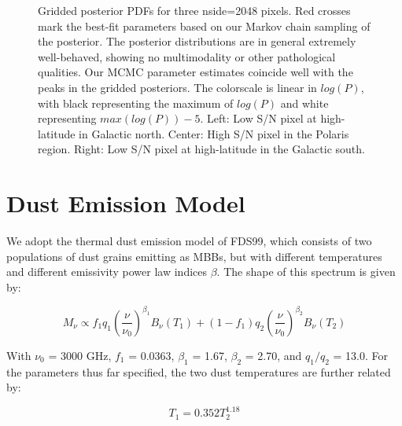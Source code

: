 \documentclass{emulateapj}
\begin{document}

\begin{figure*}
\begin{center}
\caption{Gridded posterior PDFs for three nside=2048 pixels. Red crosses mark 
the best-fit parameters based on our Markov chain sampling of the posterior. 
The posterior distributions are in general extremely well-behaved, showing
no multimodality or other pathological qualities. Our MCMC parameter 
estimates coincide well with the peaks in the gridded posteriors. The 
colorscale is linear in $log(P)$, with black representing the maximum of 
$log(P)$ and white representing $max(log(P))-5$. Left: Low S/N pixel at 
high-latitude in Galactic north. Center: High S/N pixel in the Polaris region. 
Right: Low S/N pixel at high-latitude in the Galactic south.}
\end{center}
\end{figure*}


\section{Dust Emission Model}
\label{sec:modeling}

We adopt the thermal dust emission model of FDS99, which consists of two 
populations of dust grains emitting as MBBs, but with different temperatures 
and different emissivity power law indices $\beta$. The shape of this spectrum 
is given by:

\begin{equation}
M_{\nu} \propto f_{1}q_{1}(\frac{\nu}{\nu_{0}})^{\beta_1}B_{\nu}(T_1) + (1-f_{1})q_{2}(\frac{\nu}{\nu_0})^{\beta_2}B_{\nu}(T_2)
\end{equation}

With $\nu_0$ = 3000 GHz, $f_{1}$ = 0.0363, $\beta_1$ = 1.67, $\beta_2$ = 2.70, 
and $q_1/q_2$ = 13.0. For the parameters thus far specified, the two dust 
temperatures are further related by:

\begin{equation}
T_1 = 0.352T_2^{1.18}
\end{equation}
\end{document}
